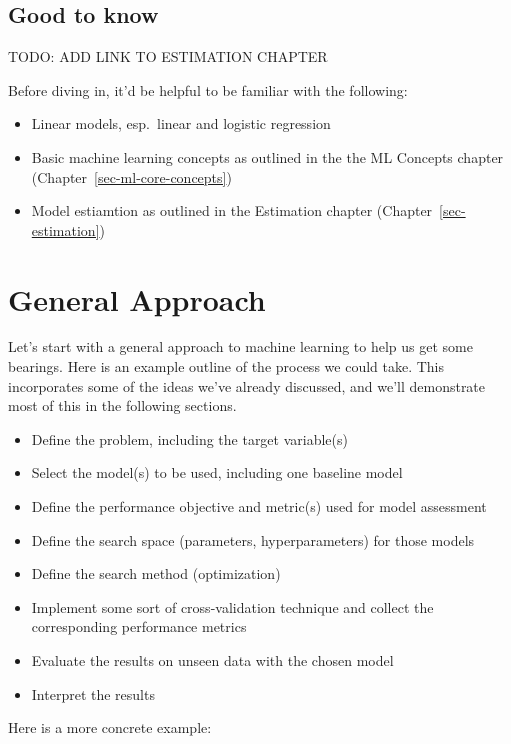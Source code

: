 \documentclass[
  letterpaper,
]{krantz}
\providecommand{\tightlist}{%
  \setlength{\itemsep}{0pt}\setlength{\parskip}{0pt}}\usepackage{longtable,booktabs,array}
\begin{document}
\subsection{Good to know}\label{good-to-know-1}

TODO: ADD LINK TO ESTIMATION CHAPTER

Before diving in, it'd be helpful to be familiar with the following:

\begin{itemize}
\tightlist
\item
  Linear models, esp.~linear and logistic regression
\item
  Basic machine learning concepts as outlined in the the ML Concepts
  chapter (Chapter~\ref{sec-ml-core-concepts})
\item
  Model estiamtion as outlined in the Estimation chapter
  (Chapter~\ref{sec-estimation})
\end{itemize}

\section{General Approach}\label{sec-ml-general-approach}

Let's start with a general approach to machine learning to help us get
some bearings. Here is an example outline of the process we could take.
This incorporates some of the ideas we've already discussed, and we'll
demonstrate most of this in the following sections.

\begin{itemize}
\tightlist
\item
  Define the problem, including the target variable(s)
\item
  Select the model(s) to be used, including one baseline model
\item
  Define the performance objective and metric(s) used for model
  assessment
\item
  Define the search space (parameters, hyperparameters) for those models
\item
  Define the search method (optimization)
\item
  Implement some sort of cross-validation technique and collect the
  corresponding performance metrics
\item
  Evaluate the results on unseen data with the chosen model
\item
  Interpret the results
\end{itemize}

Here is a more concrete example:
\end{document}
